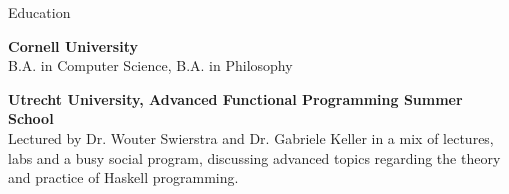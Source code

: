 
\begin{rSection}{Education}

	{\bf \large{Cornell University}} \hfill \color{darkgray}{2021 - 2025}
	\\ 
	B.A. in Computer Science, B.A. in Philosophy

	\color{black}

	{\bf \large{Utrecht University, Advanced Functional Programming Summer School}} \hfill \color{darkgray}{07/20203}
	\\ 
	Lectured by Dr. Wouter Swierstra and Dr. Gabriele Keller in a mix of lectures, labs and a busy social program, discussing advanced topics regarding the theory and practice of Haskell programming.

\end{rSection}